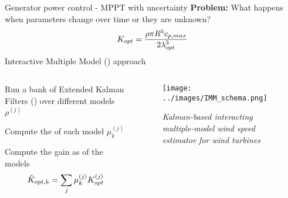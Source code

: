                                                

\begin{frame}{Generator power control - MPPT with uncertainty}
 \textcolor{yaleblue}{\textbf{Problem:}} What happens when parameters change over time or they are unknown?
  \begin{equation}
    K_{opt} =  \frac{\rho \pi R^5 c_{p,max}}{2\lambda_{opt}^3}
    \notag
  \end{equation}
  Interactive Multiple Model () approach

  \begin{columns}
    \begin{column}{0.55\columnwidth}
      \begin{myenumerate}
        \item Run a bank of Extended Kalman Filters () over different models $\rho^{(j)}$
        \item Compute the  of each model $\mu_k^{(j)}$
        \item Compute the gain as  of the models
        \begin{gather}
          \notag
          \hat{K}_{opt,k} = \sum_j \mu_k^{(j)} K_{opt}^{(j)} 
        \end{gather}
      \end{myenumerate}
    \end{column}

    \begin{column}{0.45\columnwidth}
      \begin{figure}[H]
        \centering
        \texttt{[image: ../images/IMM\_schema.png]}
        \caption{{\tiny \textit{Kalman-based interacting multiple-model wind speed estimator for wind turbines}}}
      \end{figure}
    \end{column}
  \end{columns}


\end{frame}
